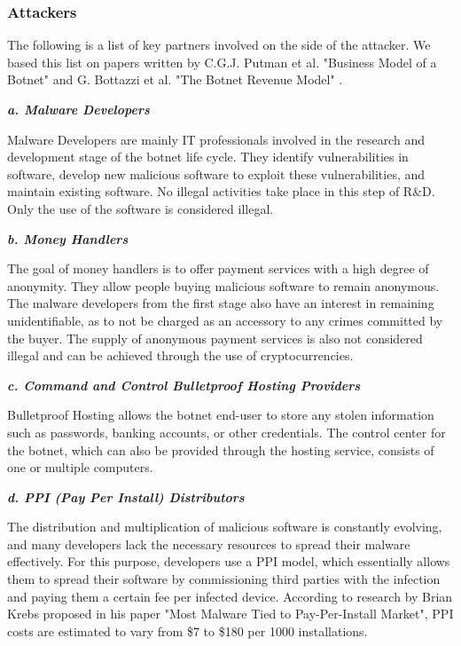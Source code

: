		\subsubsection{Attackers}

			The following is a list of key partners involved on the side of the attacker. We based this list on papers written by C.G.J. Putman et al. "Business Model of a Botnet" and G. Bottazzi et al. "The Botnet Revenue Model" \cite{Putman,Bottazzi14}.

			\textbf{\textit{a. Malware Developers}}
			
			Malware Developers are mainly IT professionals involved in the research and development stage of the botnet life cycle. They identify vulnerabilities in software, develop new malicious software to exploit these vulnerabilities, and maintain existing software. No illegal activities take place in this step of R\&D. Only the use of the software is considered illegal. \cite{Putman,Bottazzi14}

			\textbf{\textit{b. Money Handlers}}
			
			The goal of money handlers is to offer payment services with a high degree of anonymity. They allow people buying malicious software to remain anonymous. The malware developers from the first stage also have an interest in remaining unidentifiable, as to not be charged as an accessory to any crimes committed by the buyer. The supply of anonymous payment services is also not considered illegal and can be achieved through the use of cryptocurrencies. \cite{Putman,Bottazzi14}

			\textbf{\textit{c. Command and Control Bulletproof Hosting Providers}}
			
			Bulletproof Hosting allows the botnet end-user to store any stolen information such as passwords, banking accounts, or other credentials. The control center for the botnet, which can also be provided through the hosting service, consists of one or multiple computers. \cite{Putman,Bottazzi14}

			\textbf{\textit{d. PPI (Pay Per Install) Distributors}}
			
			The distribution and multiplication of malicious software is constantly evolving, and many developers lack the necessary resources to spread their malware effectively. For this purpose, developers use a PPI model, which essentially allows them to spread their software by commissioning third parties with the infection and paying them a certain fee per infected device. According to research by Brian Krebs proposed in his paper "Most Malware Tied to Pay-Per-Install Market", PPI costs are estimated to vary from \$7 to \$180 per 1000 installations. \cite{Putman,Bottazzi14}

